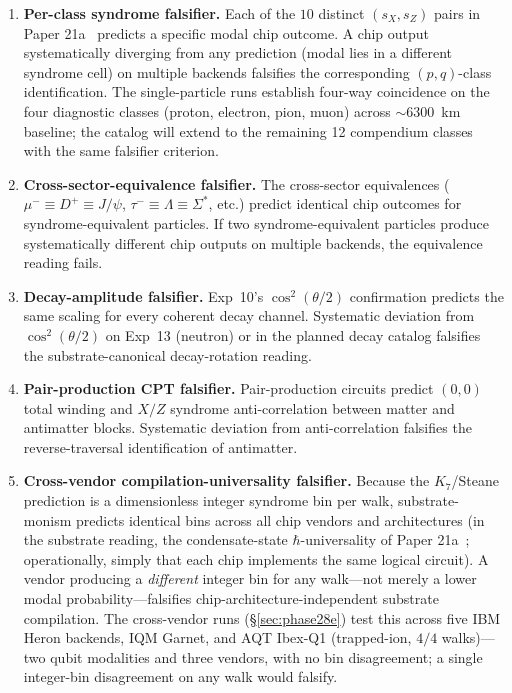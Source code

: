 \documentclass[11pt]{article}
\begin{document}
\begin{enumerate}
\item \textbf{Per-class syndrome falsifier.}  Each of the $10$ distinct $(s_X, s_Z)$ pairs in Paper 21a~\cite[Table 4]{Paper21a} predicts a specific modal chip outcome.  A chip output systematically diverging from any prediction (modal lies in a different syndrome cell) on multiple backends falsifies the corresponding $(p, q)$-class identification.  The single-particle runs establish four-way coincidence on the four diagnostic classes (proton, electron, pion, muon) across $\sim 6300$~km baseline; the catalog will extend to the remaining 12 compendium classes with the same falsifier criterion.
\item \textbf{Cross-sector-equivalence falsifier.}  The cross-sector equivalences ($\mu^- \equiv D^+ \equiv J/\psi$, $\tau^- \equiv \Lambda \equiv \Sigma^*$, etc.) predict identical chip outcomes for syndrome-equivalent particles.  If two syndrome-equivalent particles produce systematically different chip outputs on multiple backends, the equivalence reading fails.
\item \textbf{Decay-amplitude falsifier.}  Exp~10's $\cos^2(\theta/2)$ confirmation predicts the same scaling for every coherent decay channel.  Systematic deviation from $\cos^2(\theta/2)$ on Exp~13 (neutron) or in the planned decay catalog falsifies the substrate-canonical decay-rotation reading.
\item \textbf{Pair-production CPT falsifier.}  Pair-production circuits predict $(0, 0)$ total winding and $X / Z$ syndrome anti-correlation between matter and antimatter blocks.  Systematic deviation from anti-correlation falsifies the reverse-traversal identification of antimatter.
\item \textbf{Cross-vendor compilation-universality falsifier.}  Because the $K_7$/Steane prediction is a dimensionless integer syndrome bin per walk, substrate-monism predicts identical bins across all chip vendors and architectures (in the substrate reading, the condensate-state $\hbar$-universality of Paper 21a~\cite[\S 2.1]{Paper21a}; operationally, simply that each chip implements the same logical circuit).  A vendor producing a \emph{different} integer bin for any walk---not merely a lower modal probability---falsifies chip-architecture-independent substrate compilation.  The cross-vendor runs (\S\ref{sec:phase28e}) test this across five IBM Heron backends, IQM Garnet, and AQT Ibex-Q1 (trapped-ion, $4/4$ walks)---two qubit modalities and three vendors, with no bin disagreement; a single integer-bin disagreement on any walk would falsify.
\end{enumerate}
\end{document}
